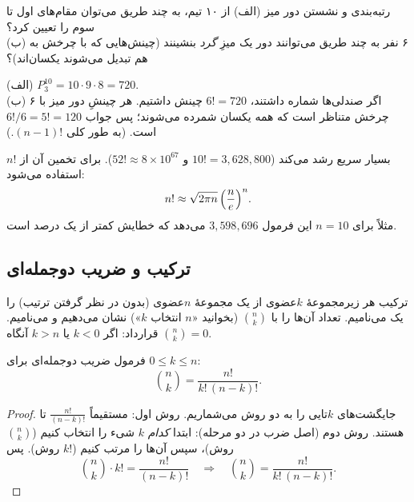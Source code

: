 \begin{example}{رتبه‌بندی و نشستن دور میز}
(الف) از ۱۰ تیم، به چند طریق می‌توان مقام‌های اول تا سوم را تعیین کرد؟ \\
(ب) ۶ نفر به چند طریق می‌توانند دور یک میزِ \emph{گرد} بنشینند (چینش‌هایی که با چرخش به هم تبدیل می‌شوند یکسان‌اند)؟
\begin{solution}
(الف) $P^{10}_3=10\cdot9\cdot8=720$.\\
(ب) اگر صندلی‌ها شماره داشتند، $6!=720$ چینش داشتیم. هر چینشِ دور میز با ۶ چرخش متناظر است که همه یکسان شمرده می‌شوند؛ پس جواب $6!/6=5!=120$ است. (به طور کلی $(n-1)!$.)
\end{solution}
\end{example}

\begin{note}
$n!$ بسیار سریع رشد می‌کند ($10!=3{,}628{,}800$ و $52!\approx8\times10^{67}$). برای تخمین آن از  استفاده می‌شود:
\[ n!\approx\sqrt{2\pi n}\,\Bigl(\frac{n}{e}\Bigr)^n. \]
مثلاً برای $n=10$ این فرمول $3{,}598{,}696$ می‌دهد که خطایش کمتر از یک درصد است.
\end{note}

\subsection{ترکیب و ضریب دوجمله‌ای}

\begin{definition}{ترکیب}
هر زیرمجموعهٔ $k$عضوی از یک مجموعهٔ $n$عضوی (بدون در نظر گرفتن ترتیب) را یک  می‌نامیم. تعداد آن‌ها را با $\binom{n}{k}$ (بخوانید «$n$ انتخاب $k$») نشان می‌دهیم و  می‌نامیم. قرارداد: اگر $k<0$ یا $k>n$ آنگاه $\binom nk=0$.
\end{definition}

\begin{theorem}[label=thm:binom-formula]{فرمول ضریب دوجمله‌ای}
برای $0\le k\le n$:
\[ \binom{n}{k}=\frac{n!}{k!\,(n-k)!}. \]
\end{theorem}

\begin{proof}
جایگشت‌های $k$تایی را به دو روش می‌شماریم. روش اول: مستقیماً $\frac{n!}{(n-k)!}$ تا هستند. روش دوم (اصل ضرب در دو مرحله): ابتدا \emph{کدام} $k$ شیء را انتخاب کنیم ($\binom nk$ روش)، سپس آن‌ها را مرتب کنیم ($k!$ روش). پس
\[ \binom nk\cdot k! = \frac{n!}{(n-k)!} \quad\Longrightarrow\quad \binom nk=\frac{n!}{k!\,(n-k)!}. \]
\end{proof}

